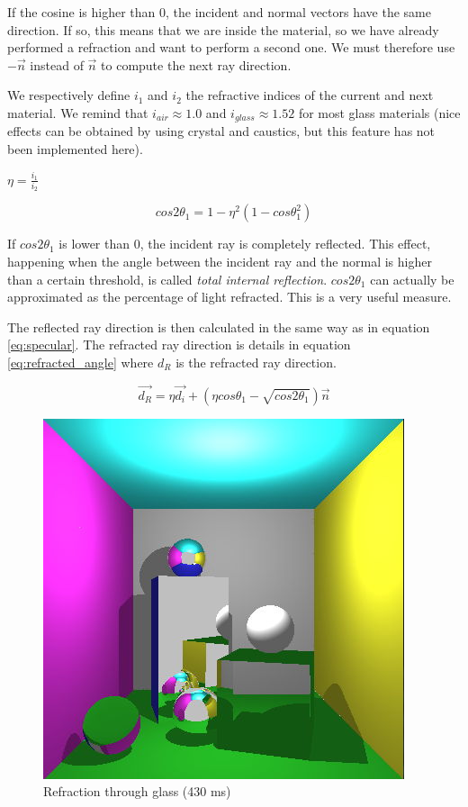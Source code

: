 If the cosine is higher than 0, the incident and normal vectors have the same direction. If so, this means that we are inside the material, so we have already performed a refraction and want to perform a second one. We must therefore use $-\vec{n}$ instead of $\vec{n}$ to compute the next ray direction.

We respectively define $i_1$ and $i_2$ the refractive indices of the current and next material. We remind that $i_{air} \approx 1.0$ and $i_{glass} \approx 1.52$ for most glass materials (nice effects can be obtained by using crystal and caustics, but this feature has not been implemented here).

$\eta = \frac{i_1}{i_2}$

\begin{equation}
cos2\theta_1 = 1 - \eta^2 (1 - cos\theta_1^2)
\label{eq:refraction_percent}
\end{equation}

If $cos2\theta_1$ is lower than 0, the incident ray is completely reflected. This effect, happening when the angle between the incident ray and the normal is higher than a certain threshold, is called \textit{total internal reflection}. $cos2\theta_1$ can actually be approximated as the percentage of light refracted. This is a very useful measure.

The reflected ray direction is then calculated in the same way as in equation \ref{eq:specular}. The refracted ray direction is details in equation \ref{eq:refracted_angle} where $d_R$ is the refracted ray direction.

\begin{equation}
\vec{d_R} = \eta \vec{d_i} + (\eta cos\theta_1 - \sqrt{cos2\theta_1}) \vec{n}
\label{eq:refracted_angle}
\end{equation}

\begin{figure}[H]
\centering
\includegraphics[width=0.35\linewidth]{img/glass_refraction.jpg}
\caption{Refraction through glass (430 ms)}
\label{fig:glass_refraction}
\end{figure}

